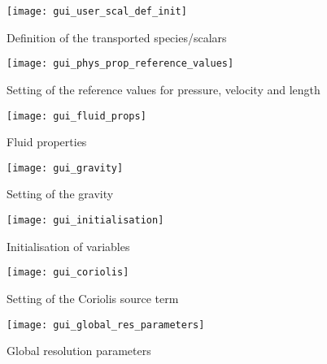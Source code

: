 {{{\begin{figure}[!ht]
\begin{center}
\texttt{[image: gui\_user\_scal\_def\_init]}
\caption{Definition of the transported species/scalars}
\label{fig:gui_species}
\end{center}
\end{figure}

\begin{figure}[!ht]
\begin{center}
\texttt{[image: gui\_phys\_prop\_reference\_values]}
\caption{Setting of the reference values for pressure, velocity and length}
\label{fig:gui_reference_values}
\end{center}
\end{figure}

\begin{figure}[!ht]
\begin{center}
\texttt{[image: gui\_fluid\_props]}
\caption{Fluid properties}
\label{fig:gui_fluid_props}
\end{center}
\end{figure}

\begin{figure}[!ht]
\begin{center}
\texttt{[image: gui\_gravity]}
\caption{Setting of the gravity}
\label{fig:gui_gravity}
\end{center}
\end{figure}

\begin{figure}[!ht]
\begin{center}
\texttt{[image: gui\_initialisation]}
\caption{Initialisation of variables}
\label{fig:gui_initialisation}
\end{center}
\end{figure}


\begin{figure}[!ht]
\begin{center}
\texttt{[image: gui\_coriolis]}
\caption{Setting of the Coriolis source term}
\label{fig:gui_coriolis}
\end{center}
\end{figure}

\begin{figure}[!ht]
\begin{center}
\texttt{[image: gui\_global\_res\_parameters]}
\caption{Global resolution parameters}
\label{fig:gui_global_parameters}
\end{center}
\end{figure}

}}}
